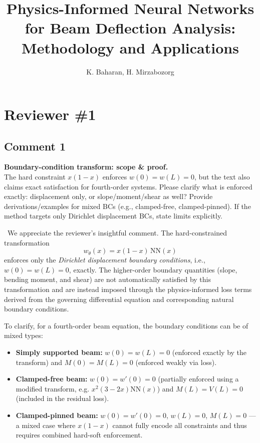 \documentclass{ar2rc}
\title{Physics-Informed Neural Networks for Beam Deflection Analysis: Methodology and Applications}
\author{K. Baharan, H. Mirzabozorg}
\begin{document}
	
	\maketitle


	\section{Reviewer \#1}



	\subsection{Comment 1}
	\RC\textbf{Boundary-condition transform: scope \& proof.}\\
    The hard constraint $x(1-x)$ enforces $w(0)=w(L)=0$, but the text also claims exact satisfaction for fourth-order systems. Please clarify what is enforced exactly: displacement only, or slope/moment/shear as well? Provide derivations/examples for mixed BCs (e.g., clamped-free, clamped-pinned). If the method targets only Dirichlet displacement BCs, state limits explicitly.
	
  \AR\ We appreciate the reviewer's insightful comment. The hard-constrained transformation 
  \[
  w_\theta(x) = x(1-x)\,\mathrm{NN}(x)
  \]
  enforces only the \emph{Dirichlet displacement boundary conditions}, i.e., $w(0)=w(L)=0$, exactly. The higher-order boundary quantities (slope, bending moment, and shear) are not automatically satisfied by this transformation and are instead imposed through the physics-informed loss terms derived from the governing differential equation and corresponding natural boundary conditions.

  To clarify, for a fourth-order beam equation, the boundary conditions can be of mixed types:
  \begin{itemize}
    \item \textbf{Simply supported beam:} $w(0)=w(L)=0$ (enforced exactly by the transform) and $M(0)=M(L)=0$ (enforced weakly via loss).
    \item \textbf{Clamped-free beam:} $w(0)=w'(0)=0$ (partially enforced using a modified transform, e.g. $x^2(3-2x)\mathrm{NN}(x)$) and $M(L)=V(L)=0$ (included in the residual loss).
    \item \textbf{Clamped-pinned beam:} $w(0)=w'(0)=0$, $w(L)=0$, $M(L)=0$ — a mixed case where $x(1-x)$ cannot fully encode all constraints and thus requires combined hard-soft enforcement.
  \end{itemize}
\end{document}
